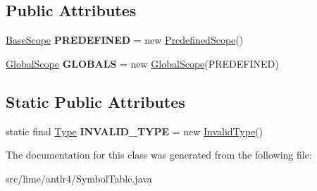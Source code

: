 \subsection*{Public Attributes}
\begin{DoxyCompactItemize}
\item 
\mbox{\label{classlime_1_1antlr4_1_1SymbolTable_a7ded93f922e3305d0e1c20deefc0cb79}} 
\hyperlink{classlime_1_1antlr4_1_1BaseScope}{Base\+Scope} {\bfseries P\+R\+E\+D\+E\+F\+I\+N\+ED} = new \hyperlink{classlime_1_1antlr4_1_1PredefinedScope}{Predefined\+Scope}()
\item 
\mbox{\label{classlime_1_1antlr4_1_1SymbolTable_a02a3f5f95d5cbd6d489d8c6fa5eb3da6}} 
\hyperlink{classlime_1_1antlr4_1_1GlobalScope}{Global\+Scope} {\bfseries G\+L\+O\+B\+A\+LS} = new \hyperlink{classlime_1_1antlr4_1_1GlobalScope}{Global\+Scope}(P\+R\+E\+D\+E\+F\+I\+N\+ED)
\end{DoxyCompactItemize}
\subsection*{Static Public Attributes}
\begin{DoxyCompactItemize}
\item 
\mbox{\label{classlime_1_1antlr4_1_1SymbolTable_aabd5311e02b31576a44c94070a480108}} 
static final \hyperlink{interfacelime_1_1antlr4_1_1Type}{Type} {\bfseries I\+N\+V\+A\+L\+I\+D\+\_\+\+T\+Y\+PE} = new \hyperlink{classlime_1_1antlr4_1_1InvalidType}{Invalid\+Type}()
\end{DoxyCompactItemize}


The documentation for this class was generated from the following file\+:\begin{DoxyCompactItemize}
\item 
src/lime/antlr4/Symbol\+Table.\+java\end{DoxyCompactItemize}

